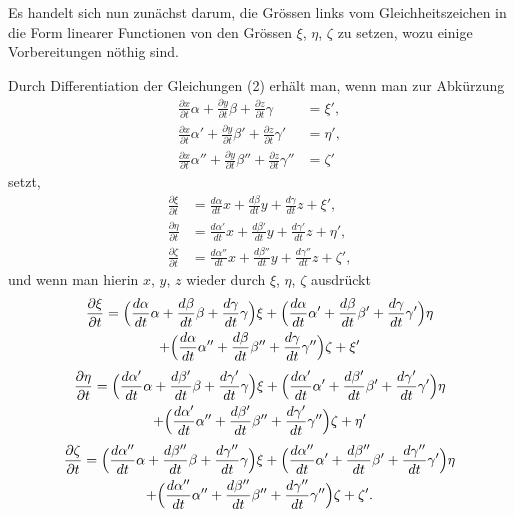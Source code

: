 \documentclass[12pt,a4paper]{article}
\begin{document}
Es handelt sich nun zunächst darum, die Grössen links vom Gleichheitszeichen in die Form linearer Functionen von den Grössen $\xi$, $\eta$, $\zeta$ zu setzen, wozu einige Vorbereitungen nöthig sind.

Durch Differentiation der Gleichungen (2) erhält man, wenn man zur Abkürzung
\begin{equation}
\tag{2}
\begin{aligned}
\frac{\partial x}{\partial t}\alpha + \frac{\partial y}{\partial t}\beta + \frac{\partial z}{\partial t}\gamma &= \xi',\\
\frac{\partial x}{\partial t}\alpha' + \frac{\partial y}{\partial t}\beta' + \frac{\partial z}{\partial t}\gamma' &= \eta',\\
\frac{\partial x}{\partial t}\alpha'' + \frac{\partial y}{\partial t}\beta'' + \frac{\partial z}{\partial t}\gamma'' &= \zeta'
\end{aligned}
\end{equation}
setzt,
\begin{align*}
\frac{\partial \xi}{\partial t} &= \frac{d\alpha}{dt}x + \frac{d\beta}{dt}y + \frac{d\gamma}{dt}z + \xi',\\
\frac{\partial \eta}{\partial t} &= \frac{d\alpha'}{dt}x + \frac{d\beta'}{dt}y + \frac{d\gamma'}{dt}z + \eta',\\
\frac{\partial \zeta}{\partial t} &= \frac{d\alpha''}{dt}x + \frac{d\beta''}{dt}y + \frac{d\gamma''}{dt}z + \zeta',
\end{align*}
und wenn man hierin $x$, $y$, $z$ wieder durch $\xi$, $\eta$, $\zeta$ ausdrückt
\begin{multline*}
\frac{\partial \xi}{\partial t} = \Bigl(\frac{d\alpha}{dt}\alpha + \frac{d\beta}{dt}\beta + \frac{d\gamma}{dt}\gamma\Bigr)\xi + \Bigl(\frac{d\alpha}{dt}\alpha' + \frac{d\beta}{dt}\beta' + \frac{d\gamma}{dt}\gamma'\Bigr)\eta\\
+ \Bigl(\frac{d\alpha}{dt}\alpha'' + \frac{d\beta}{dt}\beta'' + \frac{d\gamma}{dt}\gamma''\Bigr)\zeta + \xi'
\end{multline*}
\begin{multline*}
\frac{\partial \eta}{\partial t} = \Bigl(\frac{d\alpha'}{dt}\alpha + \frac{d\beta'}{dt}\beta + \frac{d\gamma'}{dt}\gamma\Bigr)\xi + \Bigl(\frac{d\alpha'}{dt}\alpha' + \frac{d\beta'}{dt}\beta' + \frac{d\gamma'}{dt}\gamma'\Bigr)\eta\\
+ \Bigl(\frac{d\alpha'}{dt}\alpha'' + \frac{d\beta'}{dt}\beta'' + \frac{d\gamma'}{dt}\gamma''\Bigr)\zeta + \eta'
\end{multline*}
\begin{multline*}
\frac{\partial \zeta}{\partial t} = \Bigl(\frac{d\alpha''}{dt}\alpha + \frac{d\beta''}{dt}\beta + \frac{d\gamma''}{dt}\gamma\Bigr)\xi + \Bigl(\frac{d\alpha''}{dt}\alpha' + \frac{d\beta''}{dt}\beta' + \frac{d\gamma''}{dt}\gamma'\Bigr)\eta\\
+ \Bigl(\frac{d\alpha''}{dt}\alpha'' + \frac{d\beta''}{dt}\beta'' + \frac{d\gamma''}{dt}\gamma''\Bigr)\zeta + \zeta'.
\end{multline*}
\end{document}
